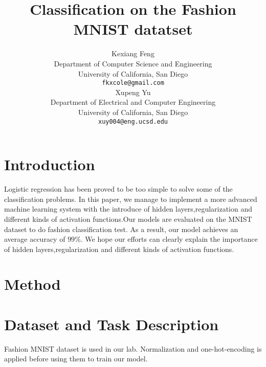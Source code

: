 \documentclass{article} %
\title{Classification on the Fashion MNIST datatset}
\author{
Kexiang Feng \\
Department of Computer Science and Engineering\\
University of California, San Diego\\
\texttt{fkxcole@gmail.com} \\
\And
Xupeng Yu \\
Department of Electrical and Computer Engineering \\
University of California, San Diego \\
\texttt{xuy004@eng.ucsd.edu}
}
\begin{document}
\maketitle

\begin{abstract}
	
\end{abstract}
\section{Introduction}
Logistic regression has been proved to be too simple to solve some of the classification problems. In this paper, we manage to implement a more advanced machine learning system with the introduce of hidden layers,regularization and different kinds of activation functions.Our models are evaluated on the MNIST dataset to do fashion classification test. As a result, our model  achieves an average accuracy of $ 99\% $. We hope our efforts can clearly explain the importance of hidden layers,regularization and different kinds of activation functions.
\section{Method}
\section{Dataset and Task Description}
Fashion MNIST dataset is used in our lab. Normalization and one-hot-encoding is applied before using them to train our model.
\end{document}
